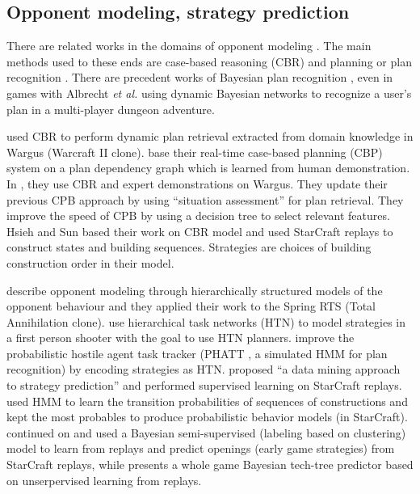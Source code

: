 \documentclass[journal]{IEEEtran}
\begin{document}
\subsection{Opponent modeling, strategy prediction}

There are related works in the domains of opponent modeling \cite{HsiehS08,SchaddBS07,OBRecog}. The main methods used to these ends are case-based reasoning (CBR) and planning or plan recognition \cite{LTW,CBR_Planning,OntanonCBR,HTNPlanning,Ramirez}. There are precedent works of Bayesian plan recognition \cite{BMPR}, even in games with Albrecht \textit{et al.} \cite{BayesianRecog} using dynamic Bayesian networks to recognize a user's plan in a multi-player dungeon adventure. 

\cite{LTW} used CBR to perform dynamic plan retrieval extracted from domain knowledge in Wargus (Warcraft II clone). \cite{CBR_Planning} base their real-time case-based planning (CBP) system on a plan dependency graph which is learned from human demonstration. In \cite{OntanonCBR,PlanRetrieval}, they use CBR and expert demonstrations on Wargus. They update their previous CPB approach by using ``situation assessment'' for plan retrieval. They improve the speed of CPB by using a decision tree to select relevant features. Hsieh and Sun \cite{HsiehS08} based their work on \cite{LTW} CBR model and used StarCraft replays to construct states and building sequences. Strategies are choices of building construction order in their model. 

\cite{SchaddBS07} describe opponent modeling through hierarchically structured models of the opponent behaviour and they applied their work to the Spring RTS (Total Annihilation clone). \cite{HTNPlanning} use hierarchical task networks (HTN) to model strategies in a first person shooter with the goal to use HTN planners. \cite{OBRecog} improve the probabilistic hostile agent task tracker (PHATT \cite{PHATT}, a simulated HMM for plan recognition) by encoding strategies as HTN. %
\cite{WeberCig09} proposed ``a data mining approach to strategy prediction'' and performed supervised learning on StarCraft replays. \cite{HMMstrat_RTS_AIIDE11} used HMM to learn the transition probabilities of sequences of constructions and kept the most probables to produce probabilistic behavior models (in StarCraft). \cite{SynnaeveOpeningCig11} continued on \cite{WeberCig09} and used a Bayesian semi-supervised (labeling based on clustering) model to learn from replays and predict openings (early game strategies) from StarCraft replays, while \cite{SynnaeveAIIDE11} presents a whole game Bayesian tech-tree predictor based on unserpervised learning from replays.
\end{document}
